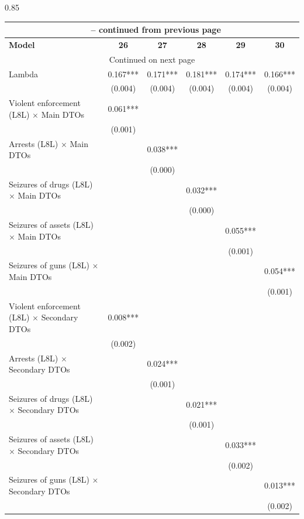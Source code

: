 \documentclass[12pt,letterpaper]{article}
\begin{document}
\begin{landscape}
\begin{center}
\begin{spacing}{0.85}
\begin{longtable}{lccccc}
\multicolumn{6}{c}{{\tablename\ \thetable{} -- continued from previous page}} \\ \hline
\multicolumn{1}{l}{\textbf{Model }} &\multicolumn{1}{c}{\textbf{26}} & \multicolumn{1}{c}{\textbf{27}} & \multicolumn{1}{c}{\textbf{28}} & \multicolumn{1}{c}{\textbf{29}} & \multicolumn{1}{c}{\textbf{30}} \\ \hline 
\endhead

\hline \multicolumn{6}{c}{{Continued on next page}} \\ \hline
\endfoot

\hline \hline
\endlastfoot

                
Lambda  & 0.167*** & 0.171*** & 0.181*** & 0.174*** & 0.166*** \\
 & (0.004)  & (0.004)  & (0.004)  & (0.004)  & (0.004)  \\

Violent enforcement (L8L) $\times$ Main DTOs & 0.061*** &   &   &   &   \\
 & (0.001)  &   &   &   &   \\
Arrests (L8L) $\times$ Main DTOs &   & 0.038*** &   &   &   \\
 &   & (0.000)  &   &   &   \\
Seizures of drugs (L8L) $\times$ Main DTOs &   &   & 0.032*** &   &   \\
 &   &   & (0.000)  &   &   \\
Seizures of assets (L8L) $\times$ Main DTOs &   &   &   & 0.055*** &   \\
 &   &   &   & (0.001)  &   \\
Seizures of guns (L8L) $\times$ Main DTOs &   &   &   &   & 0.054*** \\
 &   &   &   &   & (0.001)  \\
 
Violent enforcement (L8L) $\times$ Secondary DTOs & 0.008*** &   &   &   &   \\
 & (0.002)  &   &   &   &   \\
Arrests (L8L) $\times$ Secondary DTOs &   & 0.024*** &   &   &   \\
 &   & (0.001)  &   &   &   \\
Seizures of drugs (L8L) $\times$ Secondary DTOs &   &   & 0.021*** &   &   \\
 &   &   & (0.001)  &   &   \\
Seizures of assets (L8L) $\times$ Secondary DTOs &   &   &   & 0.033*** &   \\
 &   &   &   & (0.002)  &   \\
Seizures of guns (L8L) $\times$ Secondary DTOs &   &   &   &   & 0.013*** \\
 &   &   &   &   & (0.002)  \\
                

\end{longtable}
\end{spacing}
\end{center}
\end{landscape}
\end{document}
